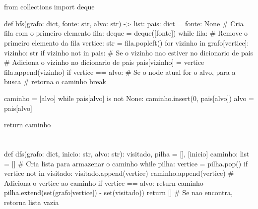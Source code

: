 \documentclass{article}
\begin{document}
\section{} %
\begin{python}
from collections import deque

def bfs(grafo: dict, fonte: str, alvo: str) -> list:
    pais: dict = {fonte: None}
    # Cria fila com o primeiro elemento
    fila: deque = deque([fonte])
    while fila:
        # Remove o primeiro elemento da fila
        vertice: str = fila.popleft()
        for vizinho in grafo[vertice]:
            vizinho: str
            if vizinho not in pais:
                # Se o vizinho nao estiver no dicionario de pais
                # Adiciona o vizinho no dicionario de pais
                pais[vizinho] = vertice
                fila.append(vizinho)
                if vertice == alvo:
                    # Se o node atual for o alvo, para a busca
                    # retorna o caminho
                    break

    caminho = [alvo]
    while pais[alvo] is not None:
        caminho.insert(0, pais[alvo])
        alvo = pais[alvo]

    return caminho
\end{python}
\href{https://github.com/aejunior/bsi-ed-ii/blob/master/src/search/bfs.py}{\faGithub}

\section{} %
\begin{python}
def dfs(grafo: dict, inicio: str, alvo: str):
    visitado, pilha = [], [inicio]
    caminho: list = []  # Cria lista para armazenar o caminho
    while pilha:
        vertice = pilha.pop()
        if vertice not in visitado:
            visitado.append(vertice)
            caminho.append(vertice)  # Adiciona o vertice ao caminho
            if vertice == alvo:
                return caminho
            pilha.extend(set(grafo[vertice]) - set(visitado)) 
    return []  # Se nao encontra, retorna lista vazia
\end{python}
\href{https://github.com/aejunior/bsi-ed-ii/blob/master/src/search/dfs.py}{\faGithub}
\end{document}
